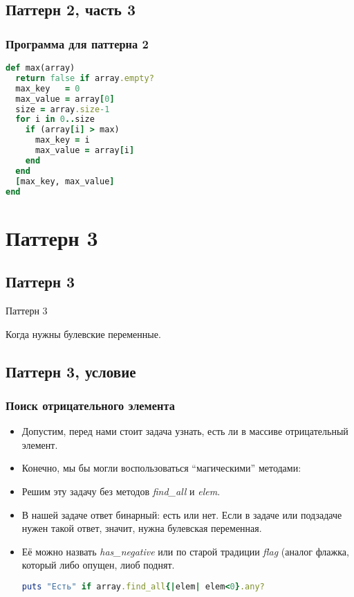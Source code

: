 \documentclass[compress,red]{beamer}
\begin{document}
\subsection{Паттерн 2, часть 3}
\begin{frame}[fragile]
\frametitle{Программа для паттерна 2}
		\scriptsize{
	  \begin{lstlisting}[label=ruby3,language=Ruby,caption=Паттерн 2]
def max(array)
  return false if array.empty?
  max_key   = 0
  max_value = array[0]
  size = array.size-1
  for i in 0..size
    if (array[i] > max)
      max_key = i
      max_value = array[i]
    end
  end
  [max_key, max_value]
end
	  \end{lstlisting}
		}
\end{frame}

\section{Паттерн 3}

\subsection{Паттерн 3}
\begin{frame}
	\begin{center}
		\Huge{Паттерн 3}
	\end{center}
	\begin{center}
		\Large{Когда нужны булевские переменные.}
	\end{center}
\end{frame}

\subsection{Паттерн 3, условие}
\begin{frame}[fragile]
\frametitle{Поиск отрицательного элемента}
		\begin{itemize}
			\item Допустим, перед нами стоит задача узнать, есть ли в массиве отрицательный элемент.
			\item Конечно, мы бы могли воспользоваться ``магическими'' методами:
			\item Решим эту задачу без методов \emph{find\_all} и \emph{elem}.
			\item В нашей задаче ответ бинарный: есть или нет. Если в задаче или подзадаче нужен такой ответ, значит, нужна булевская переменная.
			\item Её можно назвать \emph{has\_negative} или по старой традиции \emph{flag} (аналог флажка, который либо опущен, лиоб поднят.
  		\scriptsize{
  	  \begin{lstlisting}[label=ruby4,language=Ruby,caption=Паттерн 3]
      puts "Есть" if array.find_all{|elem| elem<0}.any?
  	  \end{lstlisting}			
			}
		\end{itemize}
\end{frame}
\end{document}
